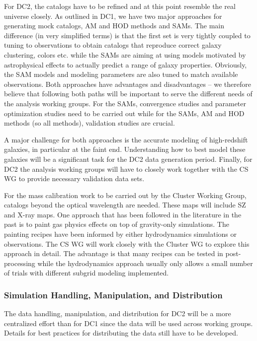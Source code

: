 For DC2, the catalogs have to be refined and at this point resemble the real universe closely. As outlined in DC1, we have two major approaches for generating mock catalogs, AM and HOD methods and SAMs. The main difference (in very simplified terms) is that the first set is very tightly coupled to tuning to observations to obtain catalogs that reproduce correct galaxy clustering, colors etc. while the SAMs are aiming at using models motivated by astrophysical effects to actually predict a range of galaxy properties. Obviously, the SAM models and modeling parameters are also tuned to match available observations. Both approaches have advantages and disadvantages -- we therefore believe that following both paths will be important to serve the different needs of the analysis working groups. For the SAMs, convergence studies and parameter optimization studies need to be carried out while for the SAMs, AM and HOD methods (so all methods), validation studies are crucial. 

A major challenge for both approaches is the accurate modeling of high-redshift galaxies, in particular at the faint end. Understanding how to best model these galaxies will be a significant task for the DC2 data generation period. 
Finally, for DC2 the analysis working groups will have to closely work together with the CS WG to provide necessary validation data sets.

For the mass calibration work to be carried out by the Cluster Working Group, catalogs beyond the optical wavelength are needed. These maps will include SZ and X-ray maps. One approach that has been followed in the literature in the past is to paint gas physics effects on top of gravity-only simulations. The painting recipes have been informed by either hydrodynamics simulations or observations. The CS WG will work closely with the Cluster WG to explore this approach in detail. The advantage is that many recipes can be tested in post-processing while the hydrodynamics approach usually only allows a small number of trials with different subgrid modeling implemented.


\subsubsection{Simulation Handling, Manipulation, and Distribution}
\label{sec:keysims:dc2:handling}

The data handling, manipulation, and distribution for DC2 will be a more centralized effort than for DC1 since the data will be used across working groups. Details for best practices for distributing the data still have to be developed.  

